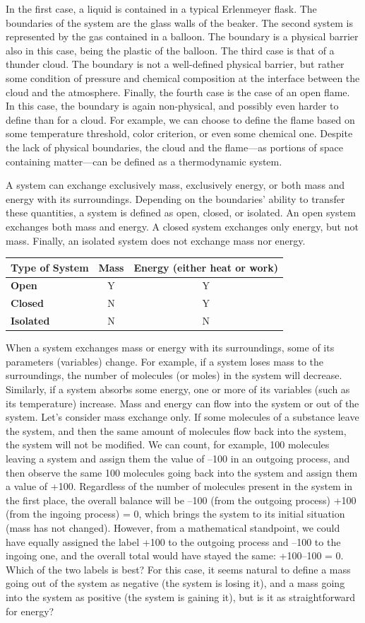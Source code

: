 \documentclass[
]{book}
\theoremstyle{definition}
\theoremstyle{definition}
\theoremstyle{definition}
\theoremstyle{remark}
\begin{document}
In the first case, a liquid is contained in a typical Erlenmeyer flask. The boundaries of the system are the glass walls of the beaker. The second system is represented by the gas contained in a balloon. The boundary is a physical barrier also in this case, being the plastic of the balloon. The third case is that of a thunder cloud. The boundary is not a well-defined physical barrier, but rather some condition of pressure and chemical composition at the interface between the cloud and the atmosphere. Finally, the fourth case is the case of an open flame. In this case, the boundary is again non-physical, and possibly even harder to define than for a cloud. For example, we can choose to define the flame based on some temperature threshold, color criterion, or even some chemical one. Despite the lack of physical boundaries, the cloud and the flame---as portions of space containing matter---can be defined as a thermodynamic system.

A system can exchange exclusively mass, exclusively energy, or both mass and energy with its surroundings. Depending on the boundaries' ability to transfer these quantities, a system is defined as open, closed, or isolated. An open system exchanges both mass and energy. A closed system exchanges only energy, but not mass. Finally, an isolated system does not exchange mass nor energy.

\begin{longtable}[]{@{}lcc@{}}
\toprule
\textbf{Type of System} & \textbf{Mass} & \textbf{Energy} (either heat or work)\tabularnewline
\midrule
\endhead
\textbf{Open} & Y & Y\tabularnewline
\textbf{Closed} & N & Y\tabularnewline
\textbf{Isolated} & N & N\tabularnewline
\bottomrule
\end{longtable}

When a system exchanges mass or energy with its surroundings, some of its parameters (variables) change. For example, if a system loses mass to the surroundings, the number of molecules (or moles) in the system will decrease. Similarly, if a system absorbs some energy, one or more of its variables (such as its temperature) increase. Mass and energy can flow into the system or out of the system. Let's consider mass exchange only. If some molecules of a substance leave the system, and then the same amount of molecules flow back into the system, the system will not be modified. We can count, for example, 100 molecules leaving a system and assign them the value of --100 in an outgoing process, and then observe the same 100 molecules going back into the system and assign them a value of +100. Regardless of the number of molecules present in the system in the first place, the overall balance will be --100 (from the outgoing process) +100 (from the ingoing process) = 0, which brings the system to its initial situation (mass has not changed). However, from a mathematical standpoint, we could have equally assigned the label +100 to the outgoing process and --100 to the ingoing one, and the overall total would have stayed the same: +100--100 = 0. Which of the two labels is best? For this case, it seems natural to define a mass going out of the system as negative (the system is losing it), and a mass going into the system as positive (the system is gaining it), but is it as straightforward for energy?
\end{document}
